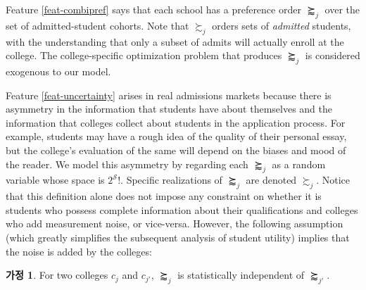\documentclass[12pt]{article} %
\theoremstyle{definition}
\newtheorem{assumption}{Assumption}
\theoremstyle{definition}
\newtheorem{assumption}{가정}
\begin{document}
Feature \ref{feat-combipref} says that each school has a preference order $\succapprox_j$ over the set of admitted-student cohorts. Note that $\succsim_j$ orders sets of \emph{admitted} students, with the understanding that only a subset of admits will actually enroll at the college. The college-specific optimization problem that produces $\succapprox_j$ is considered exogenous to our model.

Feature \ref{feat-uncertainty} arises in real admissions markets because there is asymmetry in the information that students have about themselves and the information that colleges collect about students in the application process. For example, students may have a rough idea of the quality of their personal essay, but the college's evaluation of the same will depend on the biases and mood of the reader. We model this asymmetry by regarding each $\succapprox_j$ as a random variable whose space is $2^{\mathcal{S}}!$. Specific realizations of $\succapprox_j$ are denoted $\succsim_j$. Notice that this definition alone does not impose any constraint on whether it is students who possess complete information about their qualifications and colleges who add measurement noise, or vice-versa. However, the following assumption (which greatly simplifies the subsequent analysis of student utility) implies that the noise is added by the colleges:
\begin{assumption} \label{preforderdrawnindep}
For two colleges $c_j$ and $c_{j'}$, $\succapprox_j$ is statistically independent of $\succapprox_{j'}$. 
\end{assumption}
\end{document}
